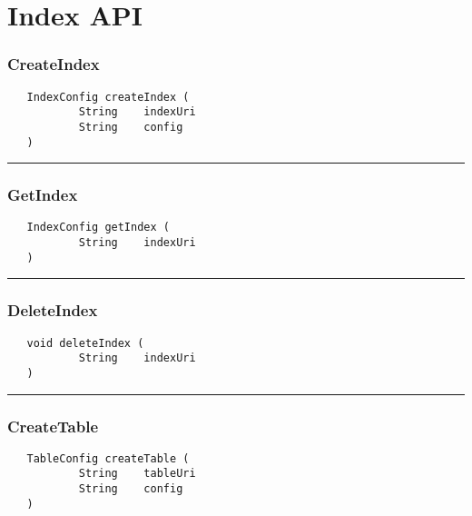 \chapter{Index API}

\subsection{CreateIndex}
\label{Api:CreateIndex}
\begin{verbatim}
   IndexConfig createIndex (
           String    indexUri
           String    config
   )
\end{verbatim}



\rule{15cm}{2pt}
\subsection{GetIndex}
\label{Api:GetIndex}
\begin{verbatim}
   IndexConfig getIndex (
           String    indexUri
   )
\end{verbatim}



\rule{15cm}{2pt}
\subsection{DeleteIndex}
\label{Api:DeleteIndex}
\begin{verbatim}
   void deleteIndex (
           String    indexUri
   )
\end{verbatim}



\rule{15cm}{2pt}
\subsection{CreateTable}
\label{Api:CreateTable}
\begin{verbatim}
   TableConfig createTable (
           String    tableUri
           String    config
   )
\end{verbatim}



